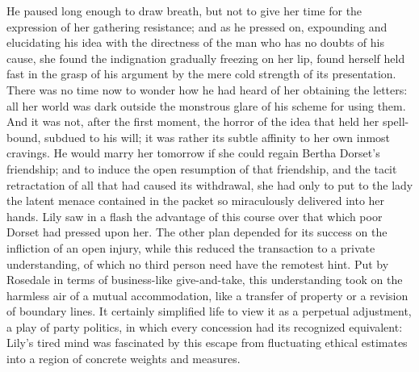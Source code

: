\documentclass[12pt,a4paper]{book}
\begin{document}
He paused long enough to draw breath, but not to give her time
for the expression of her gathering resistance; and as he pressed
on, expounding and elucidating his idea with the directness of
the man who has no doubts of his cause, she found the indignation
gradually freezing on her lip, found herself held fast in the
grasp of his argument by the mere cold strength of its
presentation. There was no time now to wonder how he had heard of
her obtaining the letters: all her world was dark outside the
monstrous glare of his scheme for using them. And it was not,
after the first moment, the horror of the idea that held her
spell-bound, subdued to his will; it was rather its subtle
affinity to her own inmost cravings. He would marry her tomorrow
if she could regain Bertha Dorset's friendship; and to induce the
open resumption of that friendship, and the tacit retractation of
all that had caused its withdrawal, she had only to put to the
lady the latent menace contained in the packet so miraculously
delivered into her hands. Lily saw in a flash the advantage of
this course over that which poor Dorset had pressed upon her. The
other plan depended for its success on the infliction of an open
injury, while this reduced the transaction to a private
understanding, of which no third person need have the remotest
hint. Put by Rosedale in terms of business-like give-and-take,
this understanding took on the harmless air of a mutual
accommodation, like a transfer of property or a revision of
boundary lines. It certainly simplified life to view it as a
perpetual adjustment, a play of party politics, in which every
concession had its recognized equivalent: Lily's tired mind was
fascinated by this escape from fluctuating ethical estimates into
a region of concrete weights and measures.
\end{document}
